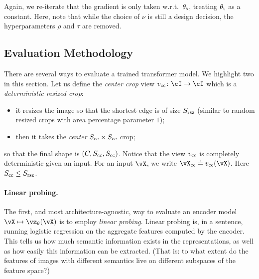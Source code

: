 \documentclass[../../book-main.tex]{subfiles}
\begin{document}
Again, we re-iterate that the gradient is only taken w.r.t.~\(\theta_{\mathrm{s}}\), treating \(\theta_{\mathrm{t}}\) as a constant. Here, note that while the choice of \(\nu\) is still a design decision, the hyperparameters \(\rho\) and \(\tau\) are removed.


\subsection{Evaluation Methodology}\label{sub:contrastive_learning_evals}
There are several ways to evaluate a trained transformer model. We highlight two in this section. Let us define the \textit{center crop} view \(v_{\cc} \colon \cI \to \cI\) which is a \textit{deterministic resized crop}:
\begin{itemize}
    \item it resizes the image so that the shortest edge is of size \(S_{\mathrm{rsz}}\) (similar to random resized crops with area percentage parameter \(1\));
    \item then it takes the \textit{center} \(S_{\mathrm{cc}} \times S_{\mathrm{cc}}\) crop;
\end{itemize}
so that the final shape is \((C, S_{\mathrm{cc}}, S_{\mathrm{cc}})\). Notice that the view \(v_{\mathrm{cc}}\) is completely deterministic given an input. For an input \(\vX\), we write \(\vX_{\cc} \doteq v_{\cc}(\vX)\). Here \(S_{\mathrm{cc}} \leq S_{\mathrm{rsz}}\).


\paragraph{Linear probing.}

The first, and most architecture-agnostic, way to evaluate an encoder model \(\vX \mapsto \vz_{\theta}(\vX)\) is to employ \textit{linear probing}. Linear probing is, in a sentence, running logistic regression on the aggregate features computed by the encoder. This tells us how much semantic information exists in the representations, as well as how easily this information can be extracted. (That is: to what extent do the features of images with different semantics live on different subspaces of the feature space?)
\end{document}
